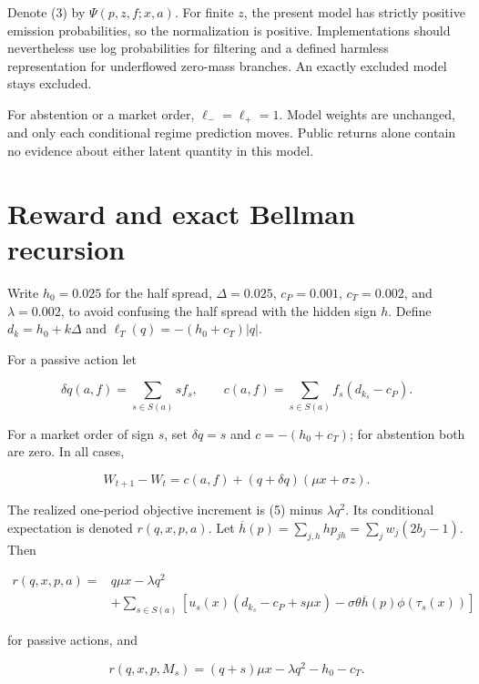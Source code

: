 \documentclass[10pt,a4paper]{article}
\begin{document}
Denote (3) by $\Psi(p,z,f;x,a)$. For finite $z$, the present model has
strictly positive emission probabilities, so the normalization is positive.
Implementations should nevertheless use log probabilities for filtering and a
defined harmless representation for underflowed zero-mass branches. An exactly
excluded model stays excluded.

For abstention or a market order, $\ell_- =\ell_+=1$. Model weights are
unchanged, and only each conditional regime prediction moves. Public returns
alone contain no evidence about either latent quantity in this model.

\section{Reward and exact Bellman recursion}

Write $h_0=0.025$ for the half spread, $\Delta=0.025$,
$c_P=0.001$, $c_T=0.002$, and $\lambda=0.002$, to avoid confusing
the half spread with the hidden sign $h$. Define
$d_k=h_0+k\Delta$ and $\ell_T(q)=-(h_0+c_T)|q|$.

For a passive action let

\begin{equation*}
\delta q(a,f)=\sum_{s\in S(a)}sf_s,\qquad
c(a,f)=\sum_{s\in S(a)}f_s(d_{k_s}-c_P).
\end{equation*}

For a market order of sign $s$, set $\delta q=s$ and
$c=-(h_0+c_T)$; for abstention both are zero. In all cases,

\begin{equation}
W_{t+1}-W_t=c(a,f)+(q+\delta q)(\mu x+\sigma z).
\tag{5}
\end{equation}

The realized one-period objective increment is (5) minus $\lambda q^2$.
Its conditional expectation is denoted $r(q,x,p,a)$. Let
$\overline h(p)=\sum_{j,h}hp_{jh}=\sum_jw_j(2b_j-1)$. Then

\begin{equation}
\begin{split}
r(q,x,p,a)
={}&q\mu x-\lambda q^2\\
&+\sum_{s\in S(a)}
\left[u_s(x)(d_{k_s}-c_P+s\mu x)
-\sigma\theta\overline h(p)\phi(\tau_s(x))\right]
\end{split}
\tag{6}
\end{equation}

for passive actions, and

\begin{equation}
r(q,x,p,M_s)=(q+s)\mu x-\lambda q^2-h_0-c_T.
\tag{7}
\end{equation}
\end{document}
